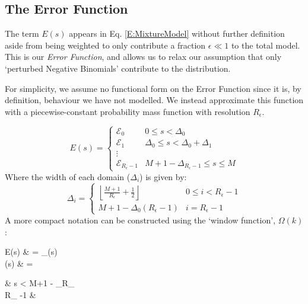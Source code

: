 \documentclass[fleqn,usenatbib]{mnras}
\newcommand{\eref}[1]{Eq. \eqref{#1}}
\begin{document}
{				\subsection{The Error Function}

					The term $E(s)$ appears in \eref{E:MixtureModel} without further definition aside from being weighted to only contribute a fraction $\epsilon \ll 1$ to the total model. This is our \textit{Error Function}, and allows us to relax our assumption that only `perturbed Negative Binomials' contribute to the distribution. 

					For simplicity, we assume no functional form on the Error Function since it is, by definition, behaviour we have not modelled. We instead approximate this function with a piecewise-constant probability mass function with resolution $R_\epsilon$.

					\begin{equation}
						E(s) = \begin{cases}
							\mathcal{E}_0 & 0 \leq s < \Delta_0
							\\
							\mathcal{E}_1 & \Delta_0 \leq s < \Delta_0 + \Delta_1
							\\
							\vdots
							\\
							\mathcal{E}_{R_\epsilon -1} & M +1 - \Delta_{R_\epsilon -1} \leq s \leq M
						\end{cases}
					\end{equation}
					Where the width of each domain ($\Delta_i$) is given by:
					\begin{equation}
						\Delta_i = \begin{cases} 
						\left\lfloor \frac{M+1}{R_\epsilon} + \frac{1}{2} \right\rfloor & 0 \leq i < R_\epsilon -1
						\\
						M +1- \Delta_0 (R_\epsilon -1)& i = R_\epsilon -1
						\end{cases}
					\end{equation}
					A more compact notation can be constructed using the `window function', $\Omega(k)$:
					\begin{spalign}
						E(s) & = _{\Omega(s)}
						\\
						\Omega(s) & = \begin{cases}
							\left\lfloor {} \right\rfloor & s < M+1 - \Delta_{R_}
							\\
							R_{\epsilon} -1 &   
						\end{cases}
					\end{spalign}


}
\end{document}
